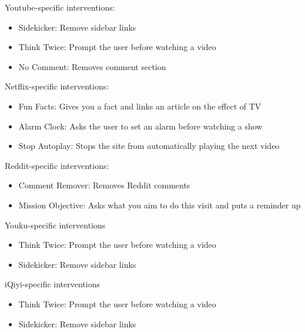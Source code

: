 Youtube-specific interventions:

\begin{itemize}
    \item Sidekicker: Remove sidebar links
    \item Think Twice: Prompt the user before watching a video
    \item No Comment: Removes comment section
\end{itemize}

\vspace{2mm}

Netflix-specific interventions:

\begin{itemize}
    \item Fun Facts: Gives you a fact and links an article on the effect of TV
    \item Alarm Clock: Asks the user to set an alarm before watching a show
    \item Stop Autoplay: Stops the site from automatically playing the next video
\end{itemize}

\vspace{2mm}

Reddit-specific interventions:

\begin{itemize}
    \item Comment Remover: Removes Reddit comments
    \item Mission Objective: Asks what you aim to do this visit and puts a reminder up
\end{itemize}

\vspace{2mm}

Youku-specific interventions

\begin{itemize}
    \item Think Twice: Prompt the user before watching a video
    \item Sidekicker: Remove sidebar links
\end{itemize}

\vspace{2mm}

iQiyi-specific interventions

\begin{itemize}
    \item Think Twice: Prompt the user before watching a video
    \item Sidekicker: Remove sidebar links
\end{itemize}

